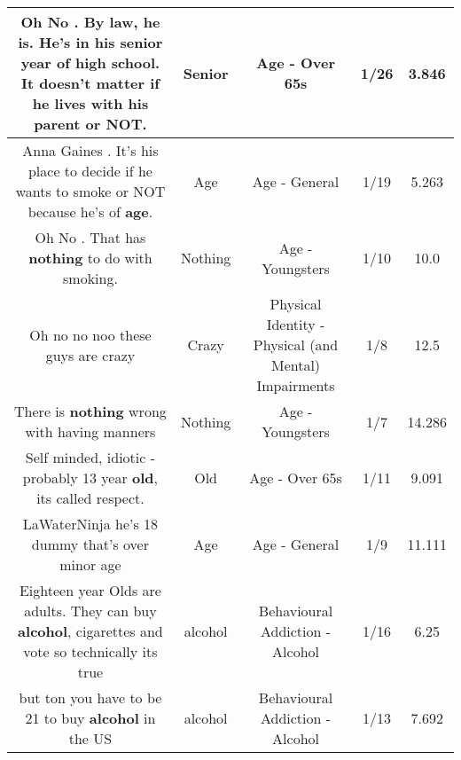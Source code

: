 \documentclass[11pt]{article}
\newlength\mylength
\begin{document}
\begin{center}
\begin{longtable}{|C{.65\mylength}|C{.30\mylength}|C{.12\mylength}|C{.12\mylength}|C{.12\mylength}|}
  \small Oh No .  By law, he is.  He's in his \textbf{senior} year of high school.  It doesn't matter if he lives with his parent or NOT.\normalsize   & Senior & Age - Over 65s & 1/26 & 3.846 \\  \hline
  \small Anna Gaines .  It's his place to decide if he wants to smoke or NOT because he's of \textbf{age}.\normalsize   & Age & Age - General & 1/19 & 5.263 \\  \hline
  \small Oh No .  That has \textbf{nothing} to do with smoking.\normalsize   & Nothing & Age - Youngsters & 1/10 & 10.0 \\  \hline
  \small Oh no no noo these guys are crazy\normalsize   & Crazy & Physical Identity - Physical (and Mental) Impairments & 1/8 & 12.5 \\  \hline
  \small There is \textbf{nothing} wrong with having manners\normalsize   & Nothing & Age - Youngsters & 1/7 & 14.286 \\  \hline
  \small Self minded, idiotic - probably 13 year \textbf{old}, its called respect.\normalsize   & Old & Age - Over 65s & 1/11 & 9.091 \\  \hline
  \small LaWaterNinja   he's 18 dummy that's over minor age\normalsize   & Age & Age - General & 1/9 & 11.111 \\  \hline
  \small Eighteen year Olds are adults. They can buy \textbf{alcohol}, cigarettes and vote so technically its true\normalsize   & alcohol & Behavioural Addiction - Alcohol & 1/16 & 6.25 \\  \hline
  \small but ton you have to be 21 to buy \textbf{alcohol} in the US\normalsize   & alcohol & Behavioural Addiction - Alcohol & 1/13 & 7.692 \\  \hline

\end{longtable}
\end{center}
\end{document}
